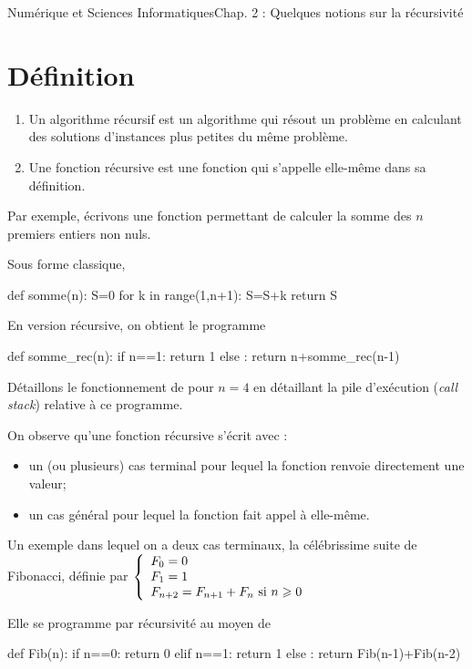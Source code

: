 \documentclass[11pt,a4paper,french,twoside]{PMCours}
\begin{document}
{Numérique et Sciences Informatiques}{Chap. 2 : Quelques notions sur la récursivité}
\section{Définition}
\begin{Definition}{}
\begin{enumerate}
\item Un algorithme récursif est un algorithme qui résout un problème 
en calculant des solutions d'instances plus petites du même problème.
\item Une fonction récursive est une fonction qui s'appelle elle-même 
dans sa définition. 
\end{enumerate}
\end{Definition}

Par exemple, écrivons une fonction permettant de calculer la somme 
des $n$ premiers entiers non nuls. 

Sous forme classique,
\begin{Python}
def somme(n):
	S=0
	for k in range(1,n+1):
		S=S+k
	return S
\end{Python}
En version récursive, on obtient le programme 
\begin{Python}
def somme_rec(n):
	if n==1:
		return 1
	else :
		return n+somme_rec(n-1)
\end{Python}
Détaillons le fonctionnement de  pour $n=4$ en détaillant 
la pile d'exécution (\emph{call stack}) relative à ce programme.

\newpage
On observe qu'une fonction récursive s'écrit avec : 
\begin{itemize}
\item un (ou plusieurs) cas terminal pour lequel la fonction renvoie 
directement une valeur;
\item un cas général pour lequel la fonction fait appel à elle-même. 
\end{itemize}

Un exemple dans lequel on a deux cas terminaux, la célébrissime 
suite de Fibonacci, définie par 
$\left\{\begin{array}{l}
F_0=0\\
F_1=1\\
F_{n+2}=F_{n+1}+F_n\text{ si $n\geqslant 0$}
\end{array}\right.$


Elle se programme par récursivité au moyen de 

\begin{Python}
def Fib(n):
	if n==0:
		return 0
	elif n==1:
		return 1
	else :
		return Fib(n-1)+Fib(n-2)
\end{Python}
\end{document}

